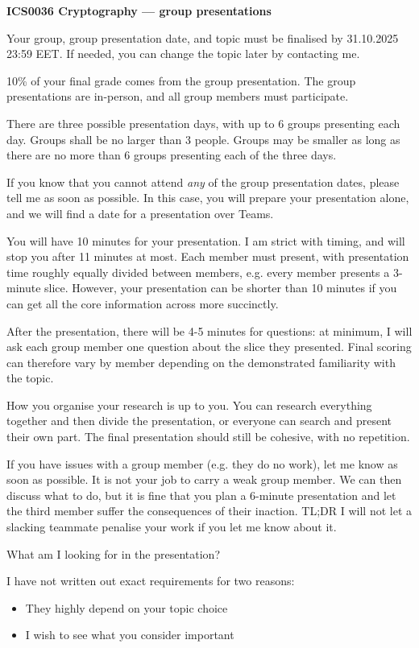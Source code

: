 \documentclass[usegeometry,parskip=half]{scrartcl}
\begin{document}
\textbf{ICS0036 Cryptography --- group presentations}

Your group, group presentation date, and topic must be finalised by 31.10.2025 23:59 EET.
If needed, you can change the topic later by contacting me.

10\% of your final grade comes from the group presentation.
The group presentations are in-person, and all group members must participate.

There are three possible presentation days, with up to 6 groups presenting each day.
Groups shall be no larger than 3 people.
Groups may be smaller as long as there are no more than 6 groups presenting each of the three days.


If you know that you cannot attend \emph{any} of the group presentation dates, please tell me as soon as possible.
In this case, you will prepare your presentation alone, and we will find a date for a presentation over Teams.

You will have 10 minutes for your presentation.
I am strict with timing, and will stop you after 11 minutes at most.
Each member must present, with presentation time roughly equally divided between members, e.g. every member presents a 3-minute slice.
However, your presentation can be shorter than 10 minutes if you can get all the core information across more succinctly.

After the presentation, there will be 4-5 minutes for questions: at minimum, I will ask each group member one question about the slice they presented.
Final scoring can therefore vary by member depending on the demonstrated familiarity with the topic.

How you organise your research is up to you.
You can research everything together and then divide the presentation, or everyone can search and present their own part.
The final presentation should still be cohesive, with no repetition.

If you have issues with a group member (e.g. they do no work), let me know as soon as possible.
It is not your job to carry a weak group member.
We can then discuss what to do, but it is fine that you plan a 6-minute presentation and let the third member suffer the consequences of their inaction.
TL;DR I will not let a slacking teammate penalise your work if you let me know about it.

What am I looking for in the presentation?

I have not written out exact requirements for two reasons:
\begin{itemize}
  \item They highly depend on your topic choice
  \item I wish to see what you consider important
\end{itemize}
\end{document}
